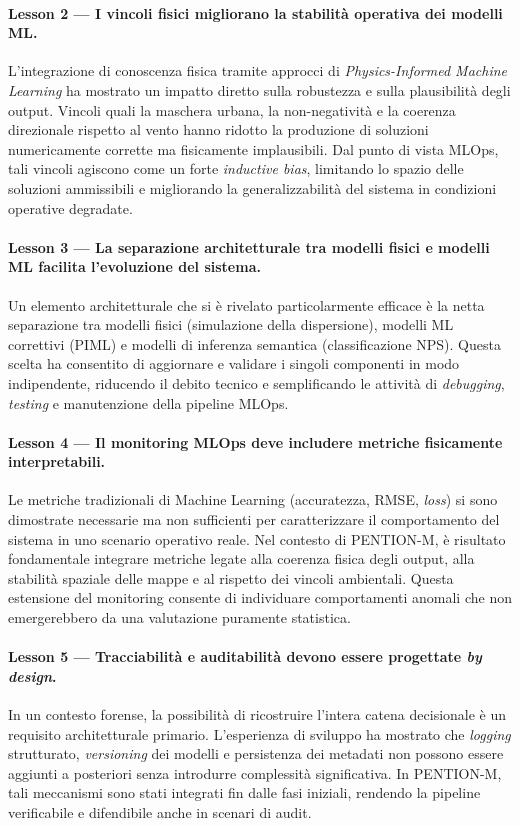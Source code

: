 \paragraph{Lesson 2 — I vincoli fisici migliorano la stabilità operativa dei modelli ML.}
L’integrazione di conoscenza fisica tramite approcci di \emph{Physics-Informed Machine Learning} ha mostrato un impatto diretto sulla robustezza e sulla plausibilità degli output.
Vincoli quali la maschera urbana, la non-negatività e la coerenza direzionale rispetto al vento hanno ridotto la produzione di soluzioni numericamente corrette ma fisicamente implausibili.
Dal punto di vista MLOps, tali vincoli agiscono come un forte \emph{inductive bias}, limitando lo spazio delle soluzioni ammissibili e migliorando la generalizzabilità del sistema in condizioni operative degradate.

\paragraph{Lesson 3 — La separazione architetturale tra modelli fisici e modelli ML facilita l’evoluzione del sistema.}
Un elemento architetturale che si è rivelato particolarmente efficace è la netta separazione tra modelli fisici (simulazione della dispersione), modelli ML correttivi (PIML) e modelli di inferenza semantica (classificazione NPS).
Questa scelta ha consentito di aggiornare e validare i singoli componenti in modo indipendente, riducendo il debito tecnico e semplificando le attività di \textit{debugging}, \textit{testing} e manutenzione della pipeline MLOps.

\paragraph{Lesson 4 — Il monitoring MLOps deve includere metriche fisicamente interpretabili.}
Le metriche tradizionali di Machine Learning (accuratezza, RMSE, \textit{loss}) si sono dimostrate necessarie ma non sufficienti per caratterizzare il comportamento del sistema in uno scenario operativo reale.
Nel contesto di \textsc{PENTION-M}, è risultato fondamentale integrare metriche legate alla coerenza fisica degli output, alla stabilità spaziale delle mappe e al rispetto dei vincoli ambientali.
Questa estensione del monitoring consente di individuare comportamenti anomali che non emergerebbero da una valutazione puramente statistica.

\paragraph{Lesson 5 — Tracciabilità e auditabilità devono essere progettate \emph{by design}.}
In un contesto forense, la possibilità di ricostruire l’intera catena decisionale è un requisito architetturale primario.
L’esperienza di sviluppo ha mostrato che \textit{logging} strutturato, \textit{versioning} dei modelli e persistenza dei metadati non possono essere aggiunti a posteriori senza introdurre complessità significativa.
In \textsc{PENTION-M}, tali meccanismi sono stati integrati fin dalle fasi iniziali, rendendo la pipeline verificabile e difendibile anche in scenari di audit.

